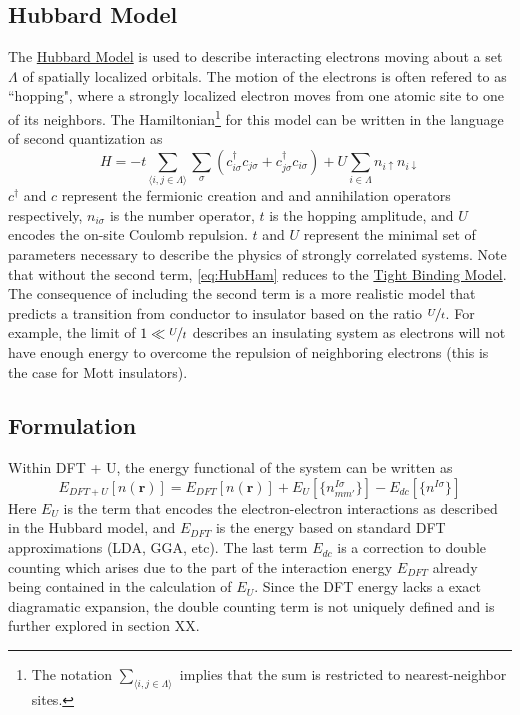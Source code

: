 \documentclass[12pt]{article}
\newcommand{\lrp}[1]{\left( #1 \right)}
\begin{document}
\subsection{Hubbard Model} %
The \href{https://en.wikipedia.org/wiki/Hubbard_model}{Hubbard Model} is used to describe interacting electrons moving about a set $\Lambda$ of spatially localized orbitals. The motion of the electrons is often refered to as ``hopping", where a strongly localized electron moves from one atomic site to one of its neighbors. The Hamiltonian\footnote{The notation $\sum_{\langle i,j\in \Lambda\rangle}$ implies that the sum is restricted to nearest-neighbor sites.} for this model can be written in the language of second quantization as 
\begin{equation}\label{eq:HubHam}
    H = -t\sum_{\langle i,j\in \Lambda\rangle}\sum_{\sigma}\lrp{c^{\dagger}_{i\sigma}c_{j\sigma}+c^{\dagger}_{j\sigma}c_{i\sigma}}+U\sum_{i\in \Lambda}n_{i\uparrow}n_{i\downarrow}
\end{equation}
$c^{\dagger}$ and $c$ represent the fermionic creation and and annihilation operators respectively, $n_{i\sigma}$ is the number operator, $t$ is the hopping amplitude, and $U$ encodes the on-site Coulomb repulsion. $t$ and $U$ represent the minimal set of parameters necessary to describe the physics of strongly correlated systems. Note that without the second term,  \eqref{eq:HubHam} reduces to the \href{https://en.wikipedia.org/wiki/Tight_binding}{Tight Binding Model}. The consequence of including the second term is a more realistic model that predicts a transition from conductor to insulator based on the ratio $\nicefrac{U}{t}$. For example, the limit of $1\ll \nicefrac{U}{t}$ describes an insulating system as electrons will not have enough energy to overcome the repulsion of neighboring electrons (this is the case for Mott insulators). 

\subsection{Formulation}
Within DFT + U, the energy functional of the system can be written as 
\begin{equation}\label{eq:Edft+u}
    E_{DFT+U}[n(\textbf{r})] = E_{DFT}[n(\textbf{r})] + E_{U}[\{n^{I\sigma}_{mm'}\}]-E_{dc}[\{n^{I\sigma}\}]
\end{equation}
Here $E_U$ is the term that encodes the electron-electron interactions as described in the Hubbard model, and $E_{DFT}$ is the energy based on standard DFT approximations (LDA, GGA, etc). The last term $E_{dc}$ is a correction to double counting which arises due to the part of the interaction energy $E_{DFT}$ already being contained in the calculation of $E_U$. Since the DFT energy lacks a exact diagramatic expansion, the double counting term is not uniquely defined and is further explored in section XX. 
\end{document}

